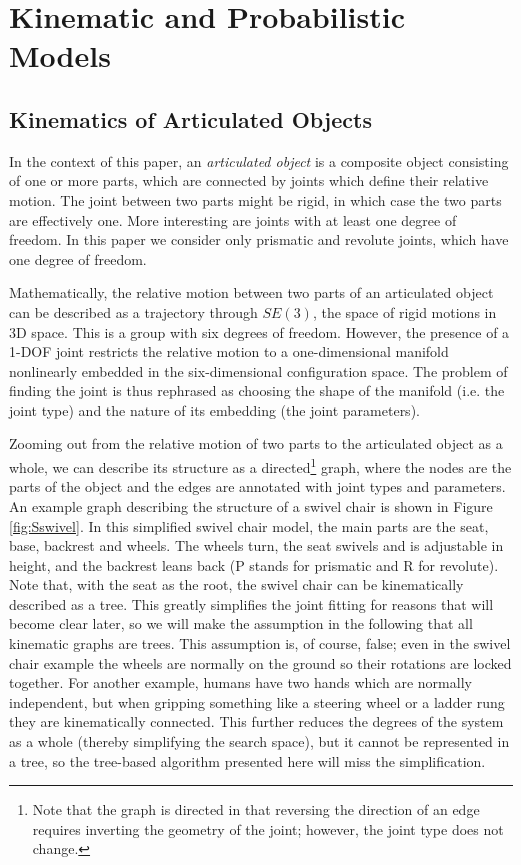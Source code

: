 \documentclass[letterpaper, 10 pt, conference]{ieeeconf}  %
\begin{document}
\section{Kinematic and Probabilistic Models} \label{sec:models}

\subsection{Kinematics of Articulated Objects}
In the context of this paper, an \emph{articulated object} is a composite object consisting of one or more parts, which are connected by joints which define their relative motion. The joint between two parts might be rigid, in which case the two parts are effectively one. More interesting are joints with at least one degree of freedom. In this paper we consider only prismatic and revolute joints, which have one degree of freedom.

Mathematically, the relative motion between two parts of an articulated object can be described as a trajectory through $SE(3)$, the space of rigid motions in 3D space. This is a group with six degrees of freedom. However, the presence of a 1-DOF joint restricts the relative motion to a one-dimensional manifold nonlinearly embedded in the six-dimensional configuration space. The problem of finding the joint is thus rephrased as choosing the shape of the manifold (i.e. the joint type) and the nature of its embedding (the joint parameters).

Zooming out from the relative motion of two parts to the articulated object as a whole, we can describe its structure as a directed\footnote{Note that the graph is directed in that reversing the direction of an edge requires inverting the geometry of the joint; however, the joint type does not change.} graph, where the nodes are the parts of the object and the edges are annotated with joint types and parameters. An example graph describing the structure of a swivel chair is shown in Figure \ref{fig:Sswivel}. In this simplified swivel chair model, the main parts are the seat, base, backrest and wheels. The wheels turn, the seat swivels and is adjustable in height, and the backrest leans back (P stands for prismatic and R for revolute). Note that, with the seat as the root, the swivel chair can be kinematically described as a tree. This greatly simplifies the joint fitting for reasons that will become clear later, so we will make the assumption in the following that all kinematic graphs are trees. This assumption is, of course, false; even in the swivel chair example the wheels are normally on the ground so their rotations are locked together. For another example, humans have two hands which are normally independent, but when gripping something like a steering wheel or a ladder rung they are kinematically connected. This further reduces the degrees of the system as a whole (thereby simplifying the search space), but it cannot be represented in a tree, so the tree-based algorithm presented here will miss the simplification.
\end{document}
